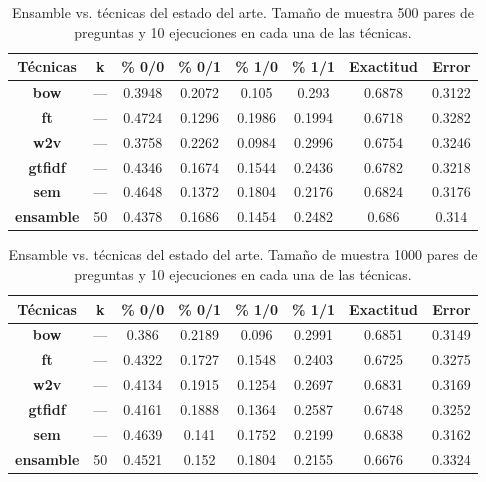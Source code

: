 \begin{table}[]
	\centering
	\footnotesize
	\begin{tabular}{|c|c|c|c|c|c|c|c|}
		\hline
		\rowcolor[HTML]{CFE2F3}
		\textbf{Técnicas} &
		\textbf{k} &
		\textbf{\% 0/0} &
		\textbf{\% 0/1} &
		\textbf{\% 1/0} &
		\textbf{\% 1/1} &
		\textbf{Exactitud} &
		\textbf{Error} \\ \hline
		\textbf{bow} &
		--- &
		0.3948 &
		0.2072 &
		0.105 &
		0.293 &
		\cellcolor[HTML]{D9EAD3}0.6878 &
		\cellcolor[HTML]{D9EAD3}0.3122 \\ \hline
		\textbf{ft}       & --- & 0.4724 & 0.1296 & 0.1986 & 0.1994 & 0.6718 & 0.3282 \\ \hline
		\textbf{w2v}      & --- & 0.3758 & 0.2262 & 0.0984 & 0.2996 & 0.6754 & 0.3246 \\ \hline
		\textbf{gtfidf}   & --- & 0.4346 & 0.1674 & 0.1544 & 0.2436 & 0.6782 & 0.3218 \\ \hline
		\textbf{sem}      & --- & 0.4648 & 0.1372 & 0.1804 & 0.2176 & 0.6824 & 0.3176 \\ \hline
		\textbf{ensamble} & 50  & 0.4378 & 0.1686 & 0.1454 & 0.2482 & 0.686  & 0.314  \\ \hline
	\end{tabular}
	\caption{Ensamble vs. técnicas del estado del arte. Tamaño de muestra 500 pares de preguntas y 10 ejecuciones en cada una de las técnicas.}
	\label{tab:equal-eda-500}
\end{table}

\begin{table}[]
	\centering
	\footnotesize
	\begin{tabular}{|c|c|c|c|c|c|c|c|}
		\hline
		\rowcolor[HTML]{CFE2F3}
		\textbf{Técnicas} &
		\textbf{k} &
		\textbf{\% 0/0} &
		\textbf{\% 0/1} &
		\textbf{\% 1/0} &
		\textbf{\% 1/1} &
		\textbf{Exactitud} &
		\textbf{Error} \\ \hline
		\textbf{bow} &
		--- &
		0.386 &
		0.2189 &
		0.096 &
		0.2991 &
		\cellcolor[HTML]{D9EAD3}0.6851 &
		\cellcolor[HTML]{D9EAD3}0.3149 \\ \hline
		\textbf{ft}       & --- & 0.4322 & 0.1727 & 0.1548 & 0.2403 & 0.6725 & 0.3275 \\ \hline
		\textbf{w2v}      & --- & 0.4134 & 0.1915 & 0.1254 & 0.2697 & 0.6831 & 0.3169 \\ \hline
		\textbf{gtfidf}   & --- & 0.4161 & 0.1888 & 0.1364 & 0.2587 & 0.6748 & 0.3252 \\ \hline
		\textbf{sem}      & --- & 0.4639 & 0.141  & 0.1752 & 0.2199 & 0.6838 & 0.3162 \\ \hline
		\textbf{ensamble} & 50  & 0.4521 & 0.152  & 0.1804 & 0.2155 & 0.6676 & 0.3324 \\ \hline
	\end{tabular}
	\caption{Ensamble vs. técnicas del estado del arte. Tamaño de muestra 1000 pares de preguntas y 10 ejecuciones en cada una de las técnicas.}
	\label{tab:equal-eda-1000}
\end{table}

